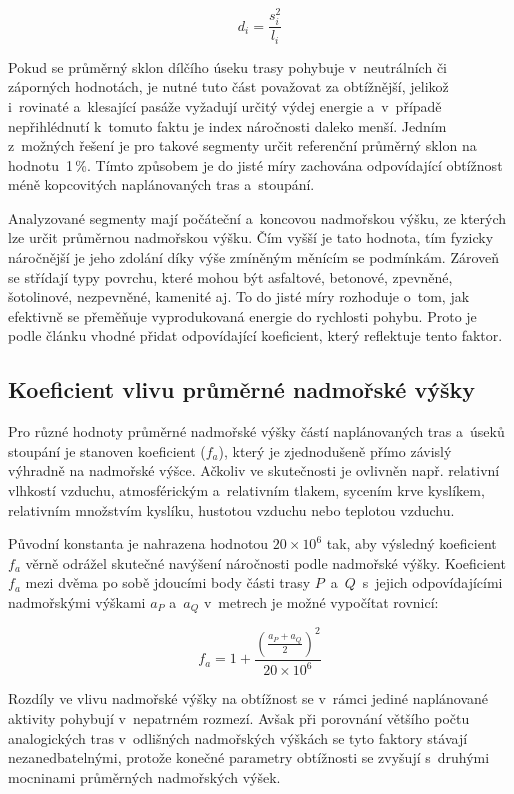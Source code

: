 \[
    d_i = \frac{s_i^2}{l_i}
\]

Pokud se průměrný sklon dílčího úseku trasy pohybuje v~neutrálních či záporných hodnotách, je nutné tuto část považovat za obtížnější, jelikož i~rovinaté a~klesající pasáže vyžadují určitý výdej energie a~v~případě nepřihlédnutí k~tomuto faktu je index náročnosti daleko menší.
Jedním z~možných řešení je pro takové segmenty určit referenční průměrný sklon na hodnotu~1\,\%.
Tímto způsobem je do jisté míry zachována odpovídající obtížnost méně kopcovitých naplánovaných tras a~stoupání.

Analyzované segmenty mají počáteční a~koncovou nadmořskou výšku, ze kterých lze určit průměrnou nadmořskou výšku.
Čím vyšší je tato hodnota, tím fyzicky náročnější je jeho zdolání díky výše zmíněným měnícím se podmínkám.
Zároveň se střídají typy povrchu, které mohou být asfaltové, betonové, zpevněné, šotolinové, nezpevněné, kamenité aj.
To do jisté míry rozhoduje o~tom, jak efektivně se přeměňuje vyprodukovaná energie do rychlosti pohybu.
Proto je podle článku \cite{JewettMatthew2024} vhodné přidat odpovídající koeficient, který reflektuje tento faktor.

\subsection{Koeficient vlivu průměrné nadmořské výšky}
\label{effect-coefficients-of-average-altitudes}

Pro různé hodnoty průměrné nadmořské výšky částí naplánovaných tras a~úseků stoupání je stanoven koeficient ($f_a$), který je zjednodušeně přímo závislý výhradně na nadmořské výšce.
Ačkoliv ve skutečnosti je ovlivněn např. relativní vlhkostí vzduchu, atmosférickým a~relativním tlakem, sycením krve kyslíkem, relativním množstvím kyslíku, hustotou vzduchu nebo teplotou vzduchu.

Původní konstanta je nahrazena hodnotou $20 \times 10^6$ tak, aby výsledný koeficient $f_a$ věrně odrážel skutečné navýšení náročnosti podle nadmořské výšky.
Koeficient $f_a$ mezi dvěma po sobě jdoucími body části trasy $P$~a~$Q$~s~jejich odpovídajícími nadmořskými výškami $a_P$ a~$a_Q$ v~metrech je možné vypočítat rovnicí:

\[
    f_a = 1 + \frac{\left(\frac{a_P + a_Q}{2}\right)^2}{20 \times 10^6}
\]

Rozdíly ve vlivu nadmořské výšky na obtížnost se v~rámci jediné naplánované aktivity pohybují v~nepatrném rozmezí.
Avšak při porovnání většího počtu analogických tras v~odlišných nadmořských výškách se tyto faktory stávají nezanedbatelnými, protože konečné parametry obtížnosti se zvyšují s~druhými mocninami průměrných nadmořských výšek.

